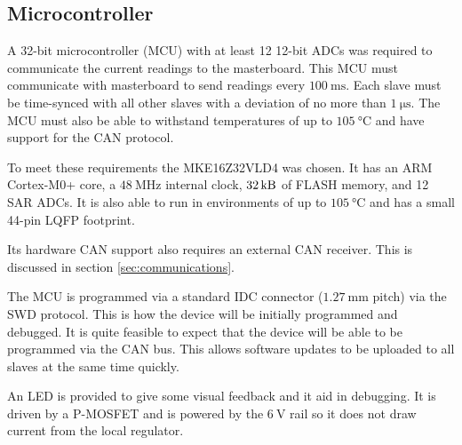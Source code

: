 \subsection{Microcontroller}
\label{sec:microcontroller}

A 32-bit microcontroller (MCU) with at least 12 12-bit ADCs was required to communicate the current readings to the masterboard.
This MCU must communicate with masterboard to send readings every $\SI{100}{\milli\second}$.
Each slave must be time-synced with all other slaves with a deviation of no more than $\SI{1}{\micro\second}$.
The MCU must also be able to withstand temperatures of up to $\SI{105}{\degreeCelsius}$ and have support for the CAN protocol.

To meet these requirements the MKE16Z32VLD4 was chosen.
It has an ARM Cortex-M0+ core, a $\SI{48}{\mega\hertz}$ internal clock, $\SI{32}{\kilo\byte}$ of FLASH memory, and 12 SAR ADCs.
It is also able to run in environments of up to $\SI{105}{\degreeCelsius}$ and has a small 44-pin LQFP footprint.

Its hardware CAN support also requires an external CAN receiver.
This is discussed in section \ref{sec:communications}.

The MCU is programmed via a standard IDC connector ($\SI{1.27}{\milli\metre}$ pitch) via the SWD protocol.
This is how the device will be initially programmed and debugged.
It is quite feasible to expect that the device will be able to be programmed via the CAN bus.
This allows software updates to be uploaded to all slaves at the same time quickly.

An LED is provided to give some visual feedback and it aid in debugging.
It is driven by a P-MOSFET and is powered by the $\SI{6}{\volt}$ rail so it does not draw current from the local regulator.

